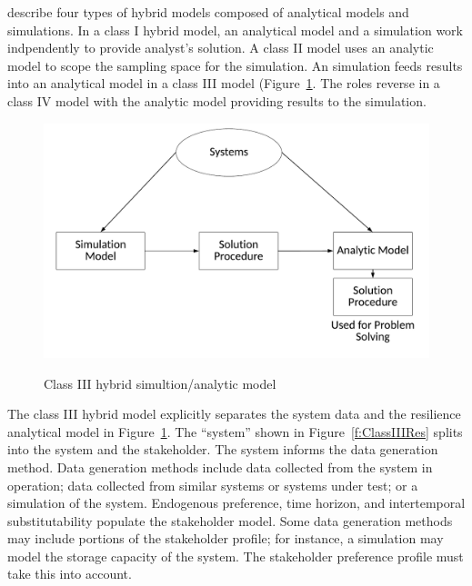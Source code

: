 \documentclass[preprint,12pt]{elsarticle}
\begin{document}
\citet{Shanthikumar1983} describe four types of hybrid models composed
of analytical models and simulations. In a class I hybrid model, an analytical model and a
simulation work indpendently to provide analyst's solution. A class II
model uses an analytic model to scope the sampling space for the
simulation. An simulation feeds results into an analytical model in a
class III model (Figure~\ref{f:ClassIIIOnly}. The roles reverse in a
class IV model with the analytic model providing results to the
simulation.

\begin{figure}
\begin{center}
\includegraphics[width=5in]{ClassIIIOnly}
\end{center}
\renewcommand{\baselinestretch}{1}
\small\normalsize
\begin{quote}
\caption[Class III hybrid simulation analytic model]{Class III hybrid
  simultion/analytic model \cite{Shanthikumar1983}
\label{f:ClassIIIOnly}}
\end{quote}
\end{figure}


The class III hybrid model explicitly separates the system data and the
resilience analytical model in Figure~\ref{f:ClassIIIOnly}. The
``system'' shown in Figure~\ref{f:ClassIIIRes} splits into the
system and the stakeholder. The system informs the data generation
method. Data generation methods include data collected from the system
in operation; data collected from similar systems or systems under
test; or a simulation of the system. Endogenous preference, time
horizon, and intertemporal substitutability populate the stakeholder
model. Some data generation methods may include portions of the
stakeholder profile; for instance, a simulation may model the storage
capacity of the system. The stakeholder preference profile must take
this into account. 
\end{document}

